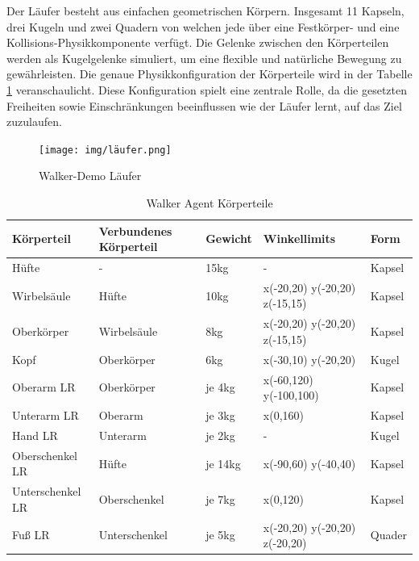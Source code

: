 Der Läufer besteht aus einfachen geometrischen Körpern. Insgesamt 11 Kapseln, drei Kugeln und zwei Quadern von welchen jede über eine Festkörper- und eine Kollisions-Physikkomponente verfügt. Die Gelenke zwischen den Körperteilen werden als Kugelgelenke simuliert, um eine flexible und natürliche Bewegung zu gewährleisten. Die genaue Physikkonfiguration der Körperteile wird in der Tabelle \ref{table:walker_körperteile} veranschaulicht. Diese Konfiguration spielt eine zentrale Rolle, da die gesetzten Freiheiten sowie Einschränkungen beeinflussen wie der Läufer lernt, auf das Ziel zuzulaufen.

\begin{figure}[H]
  \centering  
  \texttt{[image: img/läufer.png]}
  \caption{Walker-Demo Läufer}
  \label{fig:läufer}
\end{figure}

\begin{table}[H]
  \centering
  {
  \begin{tabular}{ |p{3cm}|p{3cm}|p{2cm}|p{4cm}|p{2cm}| }
  \hline
  \textbf{Körpertei}l& \textbf{Verbundenes Körperteil} & \textbf{Gewicht} & \textbf{Winkellimits} & \textbf{Form} \\
  \hline
  Hüfte & - & 15kg & - & Kapsel \\
  \hline
  Wirbelsäule & Hüfte & 10kg & x(-20,20) y(-20,20) z(-15,15) & Kapsel \\
  \hline
  Oberkörper & Wirbelsäule & 8kg & x(-20,20) y(-20,20) z(-15,15) & Kapsel \\
  \hline
  Kopf & Oberkörper & 6kg & x(-30,10) y(-20,20) & Kugel \\
  \hline
  Oberarm LR & Oberkörper & je 4kg & x(-60,120) y(-100,100) & Kapsel \\
  \hline
  Unterarm LR & Oberarm & je 3kg & x(0,160) & Kapsel \\
  \hline
  Hand LR & Unterarm & je 2kg & - & Kugel \\
  \hline
  Oberschenkel LR & Hüfte & je 14kg& x(-90,60) y(-40,40) & Kapsel \\
  \hline
  Unterschenkel LR & Oberschenkel & je 7kg &  x(0,120) & Kapsel \\
  \hline
  Fuß LR & Unterschenkel & je 5kg & x(-20,20) y(-20,20) z(-20,20) & Quader \\
  \hline
  \end{tabular}}
  \caption{Walker Agent Körperteile}
  \label{table:walker_körperteile}
\end{table}

